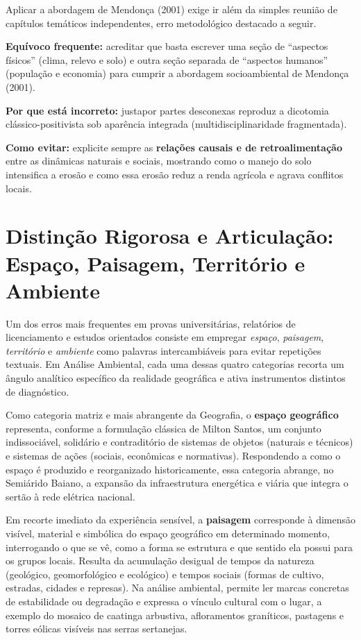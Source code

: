 Aplicar a abordagem de Mendonça (2001) exige ir além da simples reunião de capítulos temáticos independentes, erro metodológico destacado a seguir.

\begin{boxErro}
\textbf{Equívoco frequente:} acreditar que basta escrever uma seção de ``aspectos físicos'' (clima, relevo e solo) e outra seção separada de ``aspectos humanos'' (população e economia) para cumprir a abordagem socioambiental de Mendonça (2001).

\textbf{Por que está incorreto:} justapor partes desconexas reproduz a dicotomia clássico-positivista sob aparência integrada (multidisciplinaridade fragmentada).

\textbf{Como evitar:} explicite sempre as \textbf{relações causais e de retroalimentação} entre as dinâmicas naturais e sociais, mostrando como o manejo do solo intensifica a erosão e como essa erosão reduz a renda agrícola e agrava conflitos locais.
\end{boxErro}

\section{Distinção Rigorosa e Articulação: Espaço, Paisagem, Território e Ambiente}

Um dos erros mais frequentes em provas universitárias, relatórios de licenciamento e estudos orientados consiste em empregar \textit{espaço}, \textit{paisagem}, \textit{território} e \textit{ambiente} como palavras intercambiáveis para evitar repetições textuais. Em Análise Ambiental, cada uma dessas quatro categorias recorta um ângulo analítico específico da realidade geográfica e ativa instrumentos distintos de diagnóstico.

Como categoria matriz e mais abrangente da Geografia, o \textbf{espaço geográfico} representa, conforme a formulação clássica de Milton Santos, um conjunto indissociável, solidário e contraditório de sistemas de objetos (naturais e técnicos) e sistemas de ações (sociais, econômicas e normativas). Respondendo a como o espaço é produzido e reorganizado historicamente, essa categoria abrange, no Semiárido Baiano, a expansão da infraestrutura energética e viária que integra o sertão à rede elétrica nacional.

Em recorte imediato da experiência sensível, a \textbf{paisagem} corresponde à dimensão visível, material e simbólica do espaço geográfico em determinado momento, interrogando o que se vê, como a forma se estrutura e que sentido ela possui para os grupos locais. Resulta da acumulação desigual de tempos da natureza (geológico, geomorfológico e ecológico) e tempos sociais (formas de cultivo, estradas, cidades e represas). Na análise ambiental, permite ler marcas concretas de estabilidade ou degradação e expressa o vínculo cultural com o lugar, a exemplo do mosaico de caatinga arbustiva, afloramentos graníticos, pastagens e torres eólicas visíveis nas serras sertanejas.


